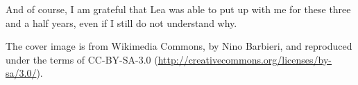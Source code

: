 And of course, I am grateful that Lea was able to put up with me for
these three and a half years, even if I still do not understand why.

The cover image is from Wikimedia Commons, by Nino Barbieri, and
reproduced under the terms of CC-BY-SA-3.0
(\url{http://creativecommons.org/licenses/by-sa/3.0/}).


